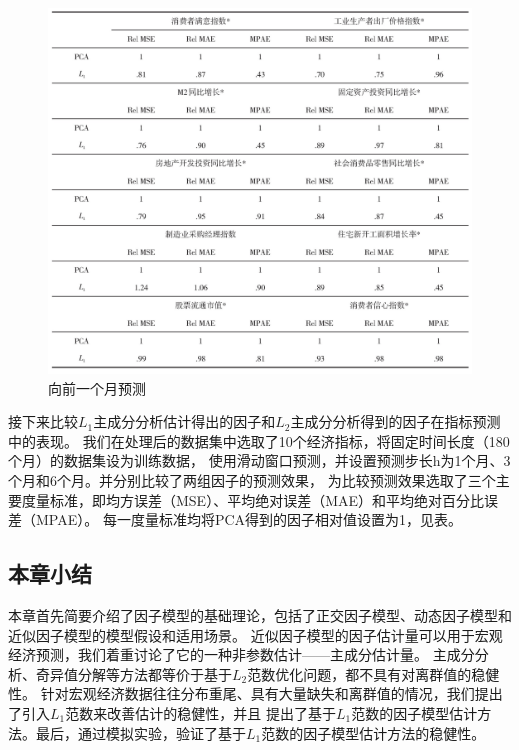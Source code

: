 \begin{figure}[H]
    \centering
    \includegraphics[width=.9\textwidth]{pics/one-month.jpg}
    \caption{\small 向前一个月预测}
    \label{one-month}
\end{figure}


接下来比较$L_1$主成分分析估计得出的因子和$L_2$主成分分析得到的因子在指标预测中的表现。
我们在处理后的数据集中选取了10个经济指标，将固定时间长度（180个月）的数据集设为训练数据，
使用滑动窗口预测，并设置预测步长h为1个月、3个月和6个月。并分别比较了两组因子的预测效果，
为比较预测效果选取了三个主要度量标准，即均方误差（MSE）、平均绝对误差（MAE）和平均绝对百分比误差（MPAE）。
每一度量标准均将PCA得到的因子相对值设置为1，见表。


\subsection{本章小结}
本章首先简要介绍了因子模型的基础理论，包括了正交因子模型、动态因子模型和近似因子模型的模型假设和适用场景。
近似因子模型的因子估计量可以用于宏观经济预测，我们着重讨论了它的一种非参数估计——主成分估计量。
主成分分析、奇异值分解等方法都等价于基于$L_2$范数优化问题，都不具有对离群值的稳健性。
针对宏观经济数据往往分布重尾、具有大量缺失和离群值的情况，我们提出了引入$L_1$范数来改善估计的稳健性，并且
提出了基于$L_1$范数的因子模型估计方法。最后，通过模拟实验，验证了基于$L_1$范数的因子模型估计方法的稳健性。